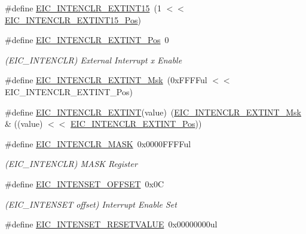\begin{DoxyCompactItemize}
\#define \mbox{\hyperlink{group___s_a_m_d21___e_i_c_gabfd06dc86f2a85667712bab8f0bbbcf7}{E\+I\+C\+\_\+\+I\+N\+T\+E\+N\+C\+L\+R\+\_\+\+E\+X\+T\+I\+N\+T15}}~(1 $<$$<$ \mbox{\hyperlink{group___s_a_m_d21___e_i_c_ga2149fe16a706ea419380b1b1d3892170}{E\+I\+C\+\_\+\+I\+N\+T\+E\+N\+C\+L\+R\+\_\+\+E\+X\+T\+I\+N\+T15\+\_\+\+Pos}})
\item 
\#define \mbox{\hyperlink{group___s_a_m_d21___e_i_c_ga741348eb720fbcd5a997515060a08f79}{E\+I\+C\+\_\+\+I\+N\+T\+E\+N\+C\+L\+R\+\_\+\+E\+X\+T\+I\+N\+T\+\_\+\+Pos}}~0
\begin{DoxyCompactList}\small\item\em (E\+I\+C\+\_\+\+I\+N\+T\+E\+N\+C\+LR) External Interrupt x Enable \end{DoxyCompactList}\item 
\#define \mbox{\hyperlink{group___s_a_m_d21___e_i_c_ga5ff4b9c6c227cf5c2af5b9ab1ba1e358}{E\+I\+C\+\_\+\+I\+N\+T\+E\+N\+C\+L\+R\+\_\+\+E\+X\+T\+I\+N\+T\+\_\+\+Msk}}~(0x\+F\+F\+F\+Ful $<$$<$ E\+I\+C\+\_\+\+I\+N\+T\+E\+N\+C\+L\+R\+\_\+\+E\+X\+T\+I\+N\+T\+\_\+\+Pos)
\item 
\#define \mbox{\hyperlink{group___s_a_m_d21___e_i_c_gace82ce29ec0f78de7cd95a1bfbcc4600}{E\+I\+C\+\_\+\+I\+N\+T\+E\+N\+C\+L\+R\+\_\+\+E\+X\+T\+I\+NT}}(value)~(\mbox{\hyperlink{group___s_a_m_d21___e_i_c_ga5ff4b9c6c227cf5c2af5b9ab1ba1e358}{E\+I\+C\+\_\+\+I\+N\+T\+E\+N\+C\+L\+R\+\_\+\+E\+X\+T\+I\+N\+T\+\_\+\+Msk}} \& ((value) $<$$<$ \mbox{\hyperlink{group___s_a_m_d21___e_i_c_ga741348eb720fbcd5a997515060a08f79}{E\+I\+C\+\_\+\+I\+N\+T\+E\+N\+C\+L\+R\+\_\+\+E\+X\+T\+I\+N\+T\+\_\+\+Pos}}))
\item 
\#define \mbox{\hyperlink{group___s_a_m_d21___e_i_c_gac121def07c8b3d84e3d58470fa7e0a2a}{E\+I\+C\+\_\+\+I\+N\+T\+E\+N\+C\+L\+R\+\_\+\+M\+A\+SK}}~0x0000\+F\+F\+F\+Ful
\begin{DoxyCompactList}\small\item\em (E\+I\+C\+\_\+\+I\+N\+T\+E\+N\+C\+LR) M\+A\+SK Register \end{DoxyCompactList}\item 
\#define \mbox{\hyperlink{group___s_a_m_d21___e_i_c_ga7544cf9b337e414ddccd4d849d263bc9}{E\+I\+C\+\_\+\+I\+N\+T\+E\+N\+S\+E\+T\+\_\+\+O\+F\+F\+S\+ET}}~0x0C
\begin{DoxyCompactList}\small\item\em (E\+I\+C\+\_\+\+I\+N\+T\+E\+N\+S\+ET offset) Interrupt Enable Set \end{DoxyCompactList}\item 
\#define \mbox{\hyperlink{group___s_a_m_d21___e_i_c_gae72659b00ea4c8017352485df071fff8}{E\+I\+C\+\_\+\+I\+N\+T\+E\+N\+S\+E\+T\+\_\+\+R\+E\+S\+E\+T\+V\+A\+L\+UE}}~0x00000000ul
$$
\end{DoxyCompactItemize}
